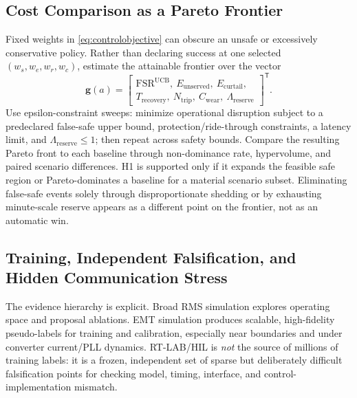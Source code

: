 \documentclass[conference]{IEEEtran}
\begin{document}
\subsection{Cost Comparison as a Pareto Frontier}

Fixed weights in \eqref{eq:controlobjective} can obscure an unsafe or excessively conservative policy. Rather than declaring success at one selected $(w_s,w_e,w_r,w_c)$, estimate the attainable frontier over the vector
\begin{equation}
\mathbf{g}(a)=
\left[\begin{gathered}
\mathrm{FSR}^{\mathrm{UCB}},\ E_{\mathrm{unserved}},\ E_{\mathrm{curtail}},\\
T_{\mathrm{recovery}},\ N_{\mathrm{trip}},\ C_{\mathrm{wear}},\ \Lambda_{\mathrm{reserve}}
\end{gathered}\right]^{\mathsf T}.
\label{eq:pareto}
\end{equation}
Use epsilon-constraint sweeps: minimize operational disruption subject to a predeclared false-safe upper bound, protection/ride-through constraints, a latency limit, and $\Lambda_{\mathrm{reserve}}\leq1$; then repeat across safety bounds. Compare the resulting Pareto front to each baseline through non-dominance rate, hypervolume, and paired scenario differences. H1 is supported only if it expands the feasible safe region or Pareto-dominates a baseline for a material scenario subset. Eliminating false-safe events solely through disproportionate shedding or by exhausting minute-scale reserve appears as a different point on the frontier, not as an automatic win.

\subsection{Training, Independent Falsification, and Hidden Communication Stress}

The evidence hierarchy is explicit. Broad RMS simulation explores operating space and proposal ablations. EMT simulation produces scalable, high-fidelity pseudo-labels for training and calibration, especially near boundaries and under converter current/PLL dynamics. RT-LAB/HIL is \emph{not} the source of millions of training labels: it is a frozen, independent set of sparse but deliberately difficult falsification points for checking model, timing, interface, and control-implementation mismatch.
\end{document}

